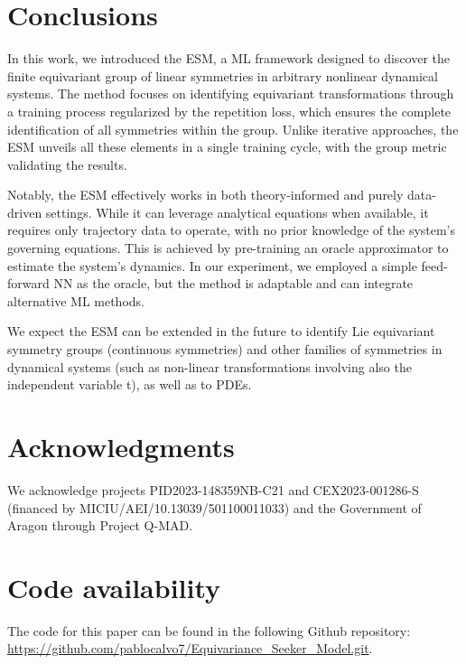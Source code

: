 
\section{Conclusions}\label{sec:conc}

In this work, we introduced the ESM, a ML framework designed to discover the finite equivariant group of linear symmetries in arbitrary nonlinear dynamical systems. The method focuses on identifying equivariant transformations through a training process regularized by the repetition loss, which ensures the complete identification of all symmetries within the group. Unlike iterative approaches, the ESM unveils all these elements in a single training cycle, with the group metric validating the results.

Notably, the ESM effectively works in both theory-informed and purely data-driven settings. While it can leverage analytical equations when available, it requires only trajectory data to operate, with no prior knowledge of the system’s governing equations. This is achieved by pre-training an oracle approximator to estimate the system's dynamics. In our experiment, we employed a simple feed-forward NN as the oracle, but the method is adaptable and can integrate alternative ML methods.

We expect the ESM can be extended in the future to identify Lie equivariant symmetry groups (continuous symmetries) and other families of symmetries in dynamical systems (such as non-linear transformations involving also the independent variable t), as well as to PDEs.

\section*{Acknowledgments}

We acknowledge projects PID2023-148359NB-C21 and CEX2023-001286-S (financed by MICIU/AEI/10.13039/501100011033) and the Government of Aragon through Project Q-MAD.

\section*{Code availability}

The code for this paper can be found in the following Github repository: \url{https://github.com/pablocalvo7/Equivariance_Seeker_Model.git}.

